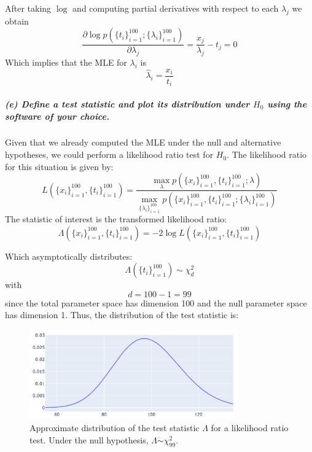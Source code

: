 \documentclass[11pt, english]{article}
\begin{document}
After taking \(\log\) and computing partial derivatives with respect to
each \(\lambda_j\) we obtain
\[ \frac{\partial \log p\left(\{t_i\}_{i=1}^{100};\{\lambda_i\}_{i=1}^{100}\right)}{\partial \lambda_j} = \frac{x_j}{\lambda_j} - t_j = 0\]
Which implies that the MLE for \(\lambda_i\) is
\[\hat{\lambda}_i = \frac{x_i}{t_i}\]

    \hypertarget{e-define-a-test-statistic-and-plot-its-distribution-under-h_0-using-the-software-of-your-choice.}{%
\subparagraph{\texorpdfstring{(e) Define a test statistic and plot its
distribution under \(H_0\) using the software of your
choice.\\[2ex]}{(e) Define a test statistic and plot its distribution under H\_0 using the software of your choice.}}\label{e-define-a-test-statistic-and-plot-its-distribution-under-h_0-using-the-software-of-your-choice.}}

    Given that we already computed the MLE under the null and alternative
hypotheses, we could perform a likelihood ratio test for \(H_0\). The
likelihood ratio for this situation is given by:
\[ L\left(\{x_i\}_{i=1}^{100},\{t_i\}_{i=1}^{100}\right) = \frac{\max_{\lambda}p\left(\{x_i\}_{i=1}^{100},\{t_i\}_{i=1}^{100};\lambda\right)}{\max_{\{\lambda_i\}_{i=1}^{100}} p\left(\{x_i\}_{i=1}^{100},\{t_i\}_{i=1}^{100};\{\lambda_i\}_{i=1}^{100}\right)} \]
The statistic of interest is the transformed likelihood ratio:
\[\Lambda\left(\{x_i\}_{i=1}^{100},\{t_i\}_{i=1}^{100}\right) = -2\log L\left(\{x_i\}_{i=1}^{100},\{t_i\}_{i=1}^{100}\right)\]

Which asymptotically distributes:
\[\Lambda\left(\{t_i\}_{i=1}^{100}\right) \sim \chi^2_d\] with
\[d = 100 - 1 = 99\] since the total parameter space has dimension 100
and the null parameter space has dimension 1. Thus, the distribution of
the test statistic is:
\begin{figure}[H]
	\centering
	\includegraphics[width=0.8\textwidth]{distribution}
	\caption{Approximate distribution of the test statistic $\Lambda$ for a likelihood ratio test. Under the null hypothesis, $\Lambda \dot\sim \chi^{2}_{99}$.}
\end{figure}
\end{document}
